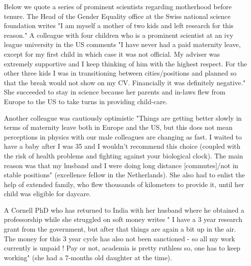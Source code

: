 \documentclass[utf8]{frontiersSCNS} %
\begin{document}
Below we quote a series of prominent scientists regarding motherhood before tenure. The Head of the Gender Equality office at the Swiss national science foundation writes "I am myself a mother of two kids and left research for this reason."  A colleague with four children who is a prominent scientist at an ivy league university in the US comments "I have never had a paid maternity leave, except for my first child in which case it was not official. My adviser was extremely supportive and I keep thinking of him with the highest respect. For the other three kids I was in transitioning between cities/positions and planned so that the break would not show on my CV. Financially it was definitely negative." She succeeded to stay in science because her parents and in-laws flew from Europe to the US to take turns in providing child-care. 

Another colleague was cautiously optimistic "Things are getting better slowly in terms of maternity leave both in Europe and the US, but this does not mean perceptions in physics with our male colleagues are changing as fast. I waited to have a baby after I was 35 and I wouldn't recommend this choice (coupled with the risk of health problems and fighting against your biological clock). The main reason was that my husband and I were doing long distance [commutes]/not in stable positions" (excellence fellow in the Netherlands). She also had to enlist the help of extended family, who flew thousands of kilometers to provide it, until her child was eligible for daycare. 

A Cornell PhD who has returned to India with her husband where he obtained a professorship while she struggled on soft money writes " I have a 3 year research grant from the government, but after that things are again a bit up in the air. The money for this 3 year cycle has also not been sanctioned - so all my work currently is unpaid ! Pay or not, academia is pretty ruthless so, one has to keep working" (she had a 7-months old daughter at the time). 
\end{document}
